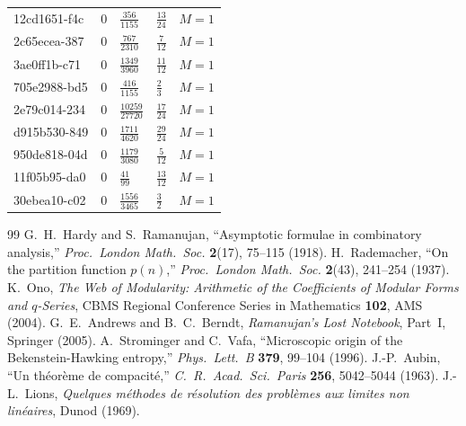 \documentclass[11pt,twoside,openright]{book}
\begin{document}
\begin{longtable}{p{4.5cm}llll}
12cd1651-f4c & $0$ & $\frac{356}{1155}$ & $\frac{13}{24}$ & $M=1$ \\
2c65ecea-387 & $0$ & $\frac{767}{2310}$ & $\frac{7}{12}$ & $M=1$ \\
3ae0ff1b-c71 & $0$ & $\frac{1349}{3960}$ & $\frac{11}{12}$ & $M=1$ \\
705e2988-bd5 & $0$ & $\frac{416}{1155}$ & $\frac{2}{3}$ & $M=1$ \\
2e79c014-234 & $0$ & $\frac{10259}{27720}$ & $\frac{17}{24}$ & $M=1$ \\
d915b530-849 & $0$ & $\frac{1711}{4620}$ & $\frac{29}{24}$ & $M=1$ \\
950de818-04d & $0$ & $\frac{1179}{3080}$ & $\frac{5}{12}$ & $M=1$ \\
11f05b95-da0 & $0$ & $\frac{41}{99}$ & $\frac{13}{12}$ & $M=1$ \\
30ebea10-c02 & $0$ & $\frac{1556}{3465}$ & $\frac{3}{2}$ & $M=1$ \\
\bottomrule
\end{longtable}

\begin{thebibliography}{99}
 G.~H.~Hardy and S.~Ramanujan, ``Asymptotic formulae in combinatory analysis,'' \textit{Proc.~London Math.~Soc.} \textbf{2}(17), 75--115 (1918).
 H.~Rademacher, ``On the partition function $p(n)$,'' \textit{Proc.~London Math.~Soc.} \textbf{2}(43), 241--254 (1937).
 K.~Ono, \textit{The Web of Modularity: Arithmetic of the Coefficients of Modular Forms and $q$-Series}, CBMS Regional Conference Series in Mathematics \textbf{102}, AMS (2004).
 G.~E.~Andrews and B.~C.~Berndt, \textit{Ramanujan's Lost Notebook}, Part~I, Springer (2005).
 A.~Strominger and C.~Vafa, ``Microscopic origin of the Bekenstein-Hawking entropy,'' \textit{Phys.~Lett.~B} \textbf{379}, 99--104 (1996).
 J.-P.~Aubin, ``Un th\'eor\`eme de compacit\'e,'' \textit{C.~R.~Acad.~Sci.~Paris} \textbf{256}, 5042--5044 (1963).
 J.-L.~Lions, \textit{Quelques m\'ethodes de r\'esolution des probl\`emes aux limites non lin\'eaires}, Dunod (1969).
\end{thebibliography}
\end{document}
